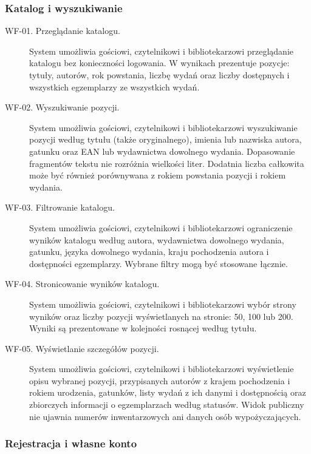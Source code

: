 \documentclass[11pt, a4paper]{article}
\begin{document}
\subsubsection{Katalog i wyszukiwanie}

\begin{description}
\item[WF-01. Przeglądanie katalogu.] System umożliwia gościowi, czytelnikowi i bibliotekarzowi przeglądanie katalogu bez konieczności logowania. W wynikach prezentuje pozycje: tytuły, autorów, rok powstania, liczbę wydań oraz liczby dostępnych i wszystkich egzemplarzy ze wszystkich wydań.
\item[WF-02. Wyszukiwanie pozycji.] System umożliwia gościowi, czytelnikowi i bibliotekarzowi wyszukiwanie pozycji według tytułu (także oryginalnego), imienia lub nazwiska autora, gatunku oraz EAN lub wydawnictwa dowolnego wydania. Dopasowanie fragmentów tekstu nie rozróżnia wielkości liter. Dodatnia liczba całkowita może być również porównywana z rokiem powstania pozycji i rokiem wydania.
\item[WF-03. Filtrowanie katalogu.] System umożliwia gościowi, czytelnikowi i bibliotekarzowi ograniczenie wyników katalogu według autora, wydawnictwa dowolnego wydania, gatunku, języka dowolnego wydania, kraju pochodzenia autora i dostępności egzemplarzy. Wybrane filtry mogą być stosowane łącznie.
\item[WF-04. Stronicowanie wyników katalogu.] System umożliwia gościowi, czytelnikowi i bibliotekarzowi wybór strony wyników oraz liczby pozycji wyświetlanych na stronie: 50, 100 lub 200. Wyniki są prezentowane w kolejności rosnącej według tytułu.
\item[WF-05. Wyświetlanie szczegółów pozycji.] System umożliwia gościowi, czytelnikowi i bibliotekarzowi wyświetlenie opisu wybranej pozycji, przypisanych autorów z krajem pochodzenia i rokiem urodzenia, gatunków, listy wydań z ich danymi i dostępnością oraz zbiorczych informacji o egzemplarzach według statusów. Widok publiczny nie ujawnia numerów inwentarzowych ani danych osób wypożyczających.
\end{description}

\subsubsection{Rejestracja i własne konto}
\end{document}
